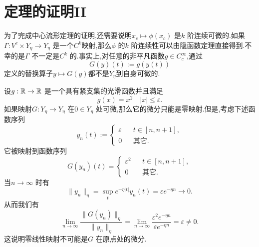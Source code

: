 \section{定理的证明II}
为了完成中心流形定理的证明,还需要说明$x_c\mapsto \phi(x_c)$ 是$k$ 阶连续可微的.如果$\Gamma:V^{c}\times Y_{\eta}\to Y_\eta$ 是一个$C^{k}$映射,那么$\phi$ 的$k$ 阶连续性可以由隐函数定理直接得到.不幸的是$\Gamma$ 不一定是$C^{k}$ 的.事实上,对任意的非平凡函数$g\in C_c^{\infty}$,通过
\begin{equation}
  G(y)(t):=g\left( y(t) \right) \label{313}
\end{equation}
定义的替换算子$y\mapsto G(y)$都不是$Y_\eta$到自身可微的.
\begin{example}
  设$g:\mathbb{R}\to \mathbb{R}$ 是一个具有紧支集的光滑函数并且满足
  \[
    g(x)=x^{2}\quad \left| x \right| \le \varepsilon .
  \] 
  如果映射$G:Y_\eta\to Y_\eta$ 在$0\in Y_\eta$ 处可微,那么它的微分只能是零映射.但是,考虑下述函数序列
  \begin{equation*}
    y_n(t):=\left\{\begin{aligned}
	\varepsilon  & & t \in [n,n+1],\\
	0 & & \text{其它}.
    \end{aligned}\right.
  \end{equation*}
  它被映射到函数序列
  \begin{equation*}
    G\left( y_n \right) (t)=\left\{
    \begin{aligned}
      \varepsilon ^2 & & t  \in [n,n+1],\\
      0 & & \text{其它}.
    \end{aligned}\right.
  \end{equation*}
  当$n\to \infty$ 时有
  \[
    \|y_n\|_\eta=\sup_t e^{-\eta\left| t \right| }y_n(t)=\varepsilon e^{-\eta n}\to 0.
  \] 
  从而我们有
  \[
    \lim_{n \to \infty} \frac{\|G(y_n)\|_\eta}{\|y_n\|_\eta}=\lim_{n \to \infty} \frac{\varepsilon ^2e^{-\eta n}}{\varepsilon e^{-\eta n}}=\varepsilon \neq 0.
  \] 
  这说明零线性映射不可能是$G$ 在原点处的微分.
\end{example}
